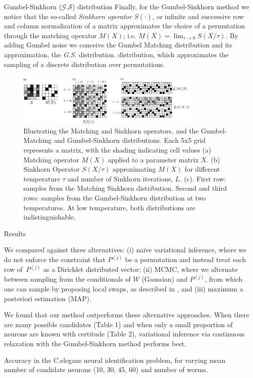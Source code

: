 \documentclass[final]{beamer}
\begin{document}
\begin{frame}[allowframebreaks]
\begin{minipage}[htp][1\textheight][t]{\textwidth}
\begin{columns}[t]
\begin{column}{.5\linewidth}
	     
	\begin{block}{Gumbel-Sinkhorn ($\mathcal{G.S}$) distribution}
Finally, for the Gumbel-Sinkhorn method we notice that the
so-called \emph{Sinkhorn operator} $S(\cdot)$, or infinite and successive row and
column normalization of a matrix approximates the choice of a permutation through the matching operator $M(X)$; i.e. $M(X)=\lim_{\tau\rightarrow 0} S(X/\tau)$. By adding Gumbel noise we conceive the Gumbel Matching distribution and its approximation, the  \emph{G.S.} distribution.
distribution, which approximates the sampling of a discrete
distribution over permutations. 
			\begin{figure}
         \includegraphics[trim = 0cm 0cm 0mm 0.0cm, clip=true, width=0.8\textwidth]{figs/Figure2.pdf}
	 \caption{Illustrating the Matching and Sinkhorn operators, and the Gumbel-Matching and Gumbel-Sinkhorn distributions. Each 5x5 grid represents a matrix, with the shading indicating cell values (a) Matching operator $M(X)$ applied to a parameter matrix $X$. (b) Sinkhorn Operator $S(X/\tau)$ approximating $M(X)$ for different temperature $\tau$ and number of Sinkhorn iterations, $L$. (c). First row: samples from the Matching Sinkhorn distribution. Second and third rows: samples from the Gumbel-Sinkhorn distribution at two temperatures. At low temperature, both distributions are indistinguishable.}
 \label{fig:figure2}
 \end{figure} 
            \end{block}	
             

      	\begin{block}{Results}
	
We compared against three alternatives: (i) na\"ive variational inference,
where we do not enforce the constraint that $P^{(j)}$ be a permutation
and instead treat each row of~$P^{(j)}$ as a Dirichlet distributed
vector; (ii) MCMC, where we alternate between sampling from the
conditionals of $W$ (Gaussian) and ${P^{(j)}}$, from which one can
sample by proposing local swaps, as described in \cite{Diaconis2009},
and (iii) maximum a posteriori estimation (MAP). 

We found that our method outperforms these alternative
approaches. When there are many possible candidates (Table 1) and when
only a small proportion of neurons are known with certitude (Table 2),
variational inference via continuous relaxation with the
Gumbel-Sinkhorn method performs best.  
\begin{table}[t]
     \caption{Accuracy in the C.elegans neural identification problem, for varying mean number of candidate neurons (10, 30, 45, 60) and number of worms.}
   \label{table:celeganssup}


\end{table}
\end{block}
\end{column}
\end{columns}
\end{minipage}
\end{frame}
\end{document}
